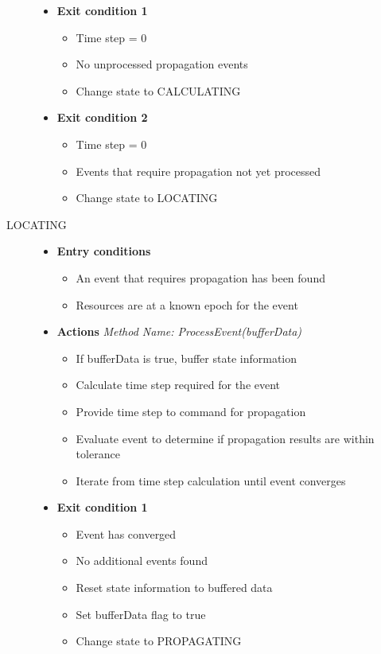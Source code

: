 \begin{description}
\begin{itemize}
\begin{itemize}
\end{itemize}
\item \textbf{Exit condition 1}
\begin{itemize}
\item Time step = 0
\item No unprocessed propagation events
\item Change state to CALCULATING
\end{itemize}
\item \textbf{Exit condition 2}
\begin{itemize}
\item Time step = 0
\item Events that require propagation not yet processed
\item Change state to LOCATING
\end{itemize}
\end{itemize}
\item[LOCATING]\hspace{1pt}
\begin{itemize}
\item \textbf{Entry conditions}
\begin{itemize}
\item An event that requires propagation has been found
\item Resources are at a known epoch for the event
\end{itemize}
\item \textbf{Actions} \textit{Method Name:  ProcessEvent(bufferData)}
\begin{itemize}
\item If bufferData is true, buffer state information
\item Calculate time step required for the event
\item Provide time step to command for propagation
\item Evaluate event to determine if propagation results are within tolerance
\item Iterate from time step calculation until event converges
\end{itemize}
\item \textbf{Exit condition 1}
\begin{itemize}
\item Event has converged
\item No additional events found
\item Reset state information to buffered data
\item Set bufferData flag to true
\item Change state to PROPAGATING

\end{itemize}
\end{itemize}
\end{description}
